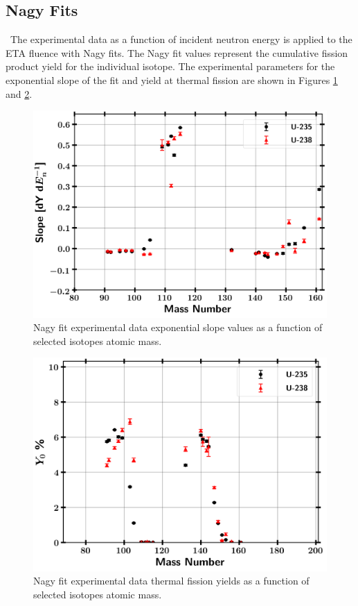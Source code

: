 \subsection{Nagy Fits}

\ The experimental data as a function of incident neutron energy is applied to the ETA fluence with Nagy fits. 
The Nagy fit values represent the cumulative fission product yield for the individual isotope. 
The experimental parameters for the exponential slope of the fit and yield at thermal fission are shown in Figures \ref{fig:nagy1} and \ref{fig:nagy2}. 

\begin{figure}[!htbp]
	\centering
	\includegraphics[width=13cm]{Figures/Chapter4/FPs/U_Fis_FitParam.png}
	\caption{Nagy fit experimental data exponential slope values as a function of selected isotopes atomic mass.}
	\label{fig:nagy1}
\end{figure}

\begin{figure}[!htbp]
	\centering
	\includegraphics[width=13cm]{Figures/Chapter4/FPs/U_Fis_FitParam_Y0_lin.png}
	\caption{Nagy fit experimental data thermal fission yields as a function of selected isotopes atomic mass.}
	\label{fig:nagy2}
\end{figure}

